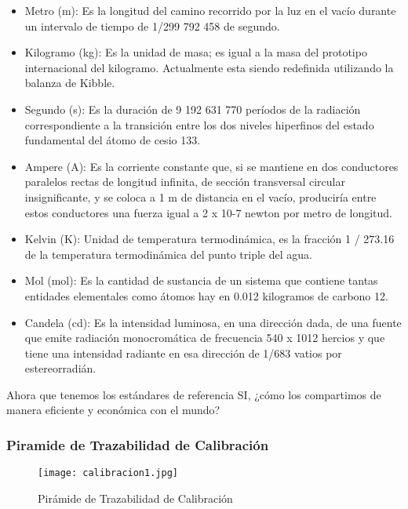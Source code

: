 \begin{itemize}
	\item  Metro (m): Es la longitud del camino recorrido por la luz en el vacío durante un intervalo de tiempo de 1/299 792 458 de segundo.
	
	\item Kilogramo (kg): Es la unidad de masa; es igual a la masa del prototipo internacional del kilogramo. Actualmente esta siendo redefinida utilizando la balanza de Kibble.
	
	\item Segundo (s): Es la duración de 9 192 631 770 períodos de la radiación correspondiente a la transición entre los dos niveles hiperfinos del estado fundamental del átomo de cesio 133.
	
	
	\item Ampere (A): Es la corriente constante que, si se mantiene en dos conductores paralelos rectas de longitud infinita, de sección transversal circular insignificante, y se coloca a 1 m de distancia en el vacío, produciría entre estos conductores una fuerza igual a 2 x 10-7 newton por metro de longitud.
	
	\item Kelvin (K): Unidad de temperatura termodinámica, es la fracción 1 / 273.16 de la temperatura termodinámica del punto triple del agua.
	
	\item Mol (mol): Es la cantidad de sustancia de un sistema que contiene tantas entidades elementales como átomos hay en 0.012 kilogramos de carbono 12.
	
	\item Candela (cd): Es la intensidad luminosa, en una dirección dada, de una fuente que emite radiación monocromática de frecuencia 540 x 1012 hercios y que tiene una intensidad radiante en esa dirección de 1/683 vatios por estereorradián.
\end{itemize}

\par \noindent
Ahora que tenemos los estándares de referencia SI, ¿cómo los compartimos de manera eficiente y económica con el mundo?

\subsubsection{Piramide de Trazabilidad de Calibración \cite{calibracion-fluke}}

\begin{figure}[H]
	\centering
	\texttt{[image: calibracion1.jpg]}
	\caption{Pirámide de Trazabilidad de Calibración}
\end{figure}

